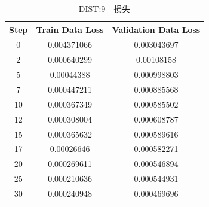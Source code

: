 \documentclass{jreport}		%
\begin{document}
\begin{table}
  \begin{center}
  \caption{DIST:9　損失}
  \begin{tabular}{c|cc} \hline
Step&Train Data Loss&Validation Data Loss \\ \hline
0&0.004371066&0.003043697 \\
2&0.000640299&0.00108158 \\
5&0.00044388&0.000998803 \\
7&0.000447211&0.000885568 \\
10&0.000367349&0.000585502 \\
12&0.000308004&0.000608787 \\
15&0.000365632&0.000589616 \\
17&0.00026646&0.000582271 \\
20&0.000269611&0.000546894 \\
25&0.000210636&0.000544931 \\
30&0.000240948&0.000469696 \\

\end{tabular}
\end{center}
\end{table}
\end{document}
